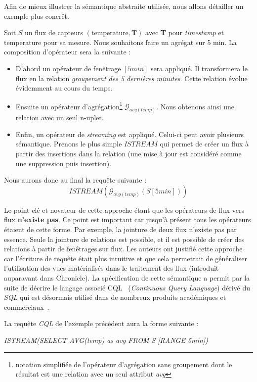 Afin de mieux illustrer la sémantique abstraite utilisée, nous allons détailler un exemple plus concrêt.
\begin{example}
Soit $S$ un flux de capteurs $(\mathrm{temperature}, \textbf{T})$ avec \textbf{T} pour \textit{timestamp} et temperature pour sa mesure. Nous souhaitons faire un agrégat sur 5 min. La composition d'opérateur sera la suivante :
\begin{itemize}
\item D'abord un opérateur de fenêtrage $[5min]$ sera appliqué. Il transformera le flux en la relation \textit{groupement des 5 dernières minutes}. Cette relation évolue évidemment au cours du temps.
\item Ensuite un opérateur d'agrégation\footnote{notation simplifiée de l'opérateur d'agrégation sans groupement dont le résultat est une relation avec un seul attribut \textit{avg}} $\mathcal G_{avg(temp)}$. Nous obtenons ainsi une relation avec un seul n-uplet.
\item Enfin, un opérateur de \textit{streaming} est appliqué. Celui-ci peut avoir plusieurs sémantique. Prenons le plus simple $ISTREAM$ qui permet de créer un flux à partir des insertions dans la relation (une mise à jour est considéré comme une suppression puis insertion).
\end{itemize}
Nous aurons donc au final la requête suivante : $$ISTREAM(\mathcal G_{avg(temp)}(S[5min]))$$
\end{example}

Le point clé et novateur de cette approche étant que les opérateurs de flux vers flux \textbf{n'existe pas}. Ce point est important car jusqu'à présent tous les opérateurs étaient de cette forme. Par exemple, la jointure de deux flux n'existe pas par essence. Seule la jointure de relations est possible, et il est possible de créer des relations à partir de fenêtrages sur flux. Les auteurs ont justifié cette approche car l'écriture de requête était plus intuitive et que cela permettait de généraliser l'utilisation des vues matérialisés dans le traitement des flux (introduit auparavant dans Chronicle). La spécification de cette sémantique a permit par la suite de décrire le langage associé CQL~\cite{Arasu:cql} (\textit{Continuous Query Language}) dérivé du \textit{SQL} qui est désormais utilisé dans de nombreux produits académiques et commerciaux~\cite{Witkowski:oraclecq,url:sqlstream}.

\begin{example}
La requête \textit{CQL} de l'exemple précédent aura la forme suivante : 
\begin{center}
\it ISTREAM(SELECT AVG(temp) as avg FROM S [RANGE 5min])
\end{center}
\end{example}

